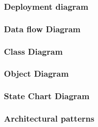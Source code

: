 \documentclass{article}
\begin{document}
	\subsubsection{Deployment diagram}
	\subsubsection{Data flow Diagram}		
	\subsubsection{Class Diagram}
	\subsubsection{Object Diagram}		
	\subsubsection{State Chart Diagram}
	\subsubsection{Architectural patterns}


	\newpage
	
	
\end{document}
